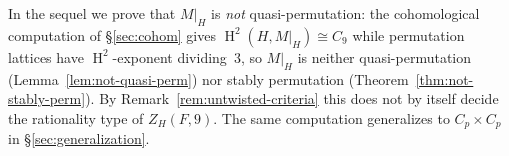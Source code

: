 \documentclass[12pt,a4paper]{article}
\newtheorem{theorem}{Theorem}[section]
\theoremstyle{definition}
\DeclareMathOperator{\Hom}{Hom}
\DeclareMathOperator{\Ext}{Ext}
\DeclareMathOperator{\coh}{H}
\begin{document}
%

In the sequel we prove that \(M|_H\) is \emph{not} quasi-permutation:
the cohomological computation of \S\ref{sec:cohom} gives
\(\coh^2(H, M|_H) \cong C_9\) while permutation lattices have
\(\coh^2\)-exponent dividing~\(3\), so \(M|_H\) is neither
quasi-permutation (Lemma~\ref{lem:not-quasi-perm}) nor stably permutation
(Theorem~\ref{thm:not-stably-perm}).  By
Remark~\ref{rem:untwisted-criteria} this does not by itself decide the
rationality type of \(Z_H(F,9)\).  The same computation generalizes to
\(C_p \times C_p\) in \S\ref{sec:generalization}.

%
%

\end{document}
